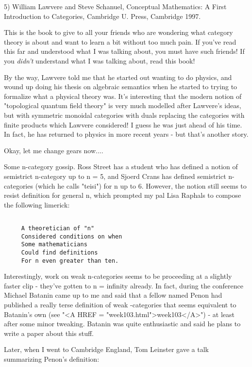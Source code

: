 5) William Lawvere and Steve Schanuel, Conceptual Mathematics:
A First Introduction to Categories, Cambridge U. Press, Cambridge 1997.

This is the book to give to all your friends who are wondering
what category theory is about and want to learn a bit without
too much pain.  If you've read this far and understood what I 
was talking about, you must have such friends!  If you \emph{didn't}
understand what I was talking about, read this book!

By the way, Lawvere told me that he started out wanting to do
physics, and wound up doing his thesis on algebraic semantics 
when he started to trying to formalize what a physical theory
was.   It's interesting that the modern notion of "topological
quantum field theory" is very much modelled after Lawvere's ideas,
but with symmetric monoidal categories with duals replacing the
categories with finite products which Lawvere considered!  I guess
he was just ahead of his time.  In fact, he has returned to physics
in more recent years - but that's another story.

Okay, let me change gears now....

Some n-category gossip.  Ross Street has a student who has defined a
notion of semistrict n-category up to n = 5, and Sjoerd Crans has
defined semistrict n-categories (which he calls "teisi") for n up to
6.  However, the notion still seems to resist definition for general
n, which prompted my pal Lisa Raphals to compose the following
limerick:

\begin{verbatim}

     A theoretician of "n"
     Considered conditions on when
     Some mathematicians
     Could find definitions 
     For n even greater than ten.
\end{verbatim}
    
Interestingly, work on weak n-categories seems to be proceeding at
a slightly faster clip - they've gotten to n = infinity already.  
In fact, during the conference Michael Batanin came up to me and said
that a fellow named Penon had published a really terse definition of 
weak \omega -categories that seems equivalent to Batanin's own 
(see "<A HREF = "week103.html">week103</A>") - at least after some minor tweaking.  Batanin was quite 
enthusiastic and said he plans to write a paper about this stuff.  

Later, when I went to Cambridge England, Tom Leinster gave a talk
summarizing Penon's definition:


